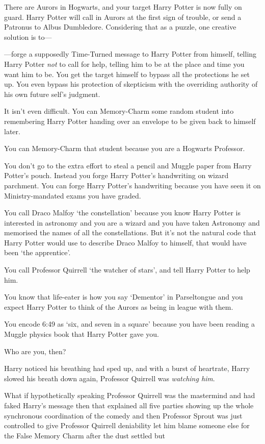 There are Aurors in Hogwarts, and your target Harry Potter is now fully on 
guard. Harry Potter will call in Aurors at the first sign of trouble, or send a 
Patronus to Albus Dumbledore. Considering that as a puzzle, one creative 
solution is to---

---forge a supposedly Time-Turned message to Harry Potter from himself, telling 
Harry Potter \emph{not} to call for help, telling him to be at the place and 
time you want him to be. You get the target himself to bypass all the 
protections he set up. You even bypass his protection of skepticism with the 
overriding authority of his own future self's judgment.

It isn't even difficult. You can Memory-Charm some random student into 
remembering Harry Potter handing over an envelope to be given back to himself 
later.

You can Memory-Charm that student because you are a Hogwarts Professor.

You don't go to the extra effort to steal a pencil and Muggle paper from Harry 
Potter's pouch. Instead you forge Harry Potter's handwriting on wizard 
parchment. You can forge Harry Potter's handwriting because you have seen it on 
Ministry-mandated exams you have graded.

You call Draco Malfoy `the constellation' because you know Harry Potter is 
interested in astronomy and you are a wizard and you have taken Astronomy and 
memorised the names of all the constellations. But it's not the natural code 
that Harry Potter would use to describe Draco Malfoy to himself, that would 
have been `the apprentice'.

You call Professor Quirrell `the watcher of stars', and tell Harry Potter to 
help him.

You know that life-eater is how you say `Dementor' in Parseltongue and you 
expect Harry Potter to think of the Aurors as being in league with them.

You encode 6:49 as `six, and seven in a square' because you have been reading a 
Muggle physics book that Harry Potter gave you.

Who are you, then?

Harry noticed his breathing had sped up, and with a burst of heartrate, Harry 
slowed his breath down again, Professor Quirrell was \emph{watching him}.

What if hypothetically speaking Professor Quirrell was the mastermind and had 
faked Harry's message then that explained all five parties showing up the whole 
synchronous coordination of the comedy and then Professor Sprout was just 
controlled to give Professor Quirrell deniability let him blame someone else 
for the False Memory Charm after the dust settled but

